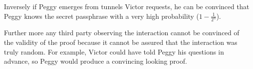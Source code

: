 Inversely if Peggy emerges from tunnels Victor requests, he can be convinced that Peggy knows the secret passphrase with a very high probability ($1 - \frac{1}{2^n}$).

\bigskip

Further more any third party observing the interaction cannot be convinced of the validity of the proof because it cannot be assured that the interaction was truly random. For example, Victor could have told Peggy his questions in advance, so Peggy would produce a convincing looking proof.

\newpage


